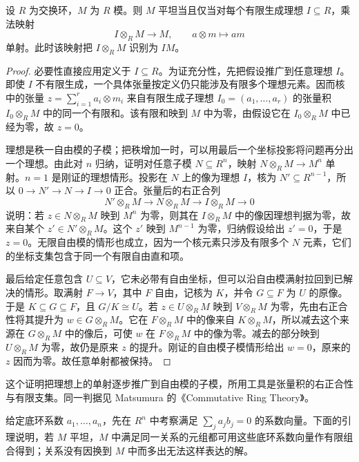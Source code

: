 \begin{theorem}[理想张量判据]\label{b3:thm:ideal-flatness-criterion}
	设 \(R\) 为交换环，\(M\) 为 \(R\) 模。则 \(M\) 平坦当且仅当对每个有限生成理想 \(I\subseteq R\)，乘法映射
	\[
		I\otimes_RM\longrightarrow M,\qquad a\otimes m\longmapsto am
	\]
	单射。此时该映射把 \(I\otimes_RM\) 识别为 \(IM\)。
\end{theorem}
\begin{proof}
	必要性直接应用定义于 \(I\subseteq R\)。为证充分性，先把假设推广到任意理想 \(I\)。即使 \(I\) 不有限生成，一个具体张量按定义仍只能涉及有限多个理想元素。因而核中的张量 \(z=\sum_{i=1}^r a_i\otimes m_i\) 来自有限生成子理想 \(I_0=(a_1,\ldots,a_r)\) 的张量积 \(I_0\otimes_RM\) 中的同一个有限和。该有限和映到 \(M\) 中为零，由假设它在 \(I_0\otimes_RM\) 中已经为零，故 \(z=0\)。

	理想是秩一自由模的子模；把秩增加一时，可以用最后一个坐标投影将问题再分出一个理想。由此对 \(n\) 归纳，证明对任意子模 \(N\subseteq R^n\)，映射 \(N\otimes_RM\to M^n\) 单射。\(n=1\) 是刚证的理想情形。投影在 \(N\) 上的像为理想 \(I\)，核为 \(N'\subseteq R^{n-1}\)，所以 \(0\to N'\to N\to I\to0\) 正合。张量后的右正合列
	\[
		N'\otimes_RM\longrightarrow N\otimes_RM\longrightarrow I\otimes_RM\longrightarrow0
	\]
	说明：若 \(z\in N\otimes_RM\) 映到 \(M^n\) 为零，则其在 \(I\otimes_RM\) 中的像因理想判据为零，故来自某个 \(z'\in N'\otimes_RM\)。这个 \(z'\) 映到 \(M^{n-1}\) 为零，归纳假设给出 \(z'=0\)，于是 \(z=0\)。无限自由模的情形也成立，因为一个核元素只涉及有限多个 \(N\) 元素，它们的坐标支集包含于同一个有限自由直和项。

	最后给定任意包含 \(U\subseteq V\)，它未必带有自由坐标，但可以沿自由模满射拉回到已解决的情形。取满射 \(F\to V\)，其中 \(F\) 自由，记核为 \(K\)，并令 \(G\subseteq F\) 为 \(U\) 的原像。于是 \(K\subseteq G\subseteq F\)，且 \(G/K\cong U\)。若 \(z\in U\otimes_RM\) 映到 \(V\otimes_RM\) 为零，先由右正合性将其提升为 \(w\in G\otimes_RM\)。它在 \(F\otimes_RM\) 中的像来自 \(K\otimes_RM\)，所以减去这个来源在 \(G\otimes_RM\) 中的像后，可使 \(w\) 在 \(F\otimes_RM\) 中的像为零。减去的部分映到 \(U\otimes_RM\) 为零，故仍是原来 \(z\) 的提升。刚证的自由模子模情形给出 \(w=0\)，原来的 \(z\) 因而为零。故任意单射都被保持。
\end{proof}

这个证明把理想上的单射逐步推广到自由模的子模，所用工具是张量积的右正合性与有限支集。同一判据见 Matsumura 的《Commutative Ring Theory》\cite[\S7, Theorem 7.7, p. 50]{Matsumura1989CommutativeRingTheory}。

给定底环系数 \(a_1,\ldots,a_n\)，先在 \(R^n\) 中考察满足 \(\sum_j a_jb_j=0\) 的系数向量。下面的引理说明，若 \(M\) 平坦，\(M\) 中满足同一关系的元组都可用这些底环系数向量作有限组合得到；关系没有因换到 \(M\) 中而多出无法这样表达的解。

